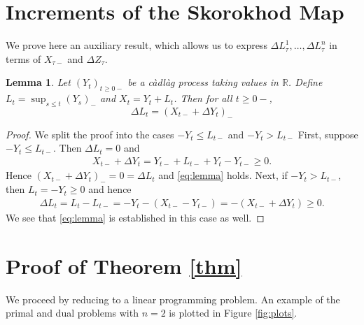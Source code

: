 \documentclass[12pt]{article}
\newcommand{\R}{\mathbb{R}}
\newcommand{\lb}{\left}
\newcommand{\rb}{\right}
\theoremstyle{plain}
\newtheorem{lemma}{Lemma}
\theoremstyle{definition}
\theoremstyle{remark}
\begin{document}
\section{Increments of the Skorokhod Map}

We prove here an auxiliary result, which allows us to express $\Delta L^1_\tau,\dots, \Delta L^n_\tau$ in terms of $X_{\tau-}$ and $\Delta Z_\tau$.

\begin{lemma}\label{lemma}
Let $(Y_t)_{t\ge 0-}$ be a c\`adl\`ag process taking values in $\R$. Define $L_t=\sup_{s\le t} (Y_s)_-$ and $X_t=Y_t+L_t$. Then for all $t\ge 0-$,
\begin{equation}\label{eq:lemma}
\Delta L_t =\lb(X_{t-}+\Delta Y_t\rb)_-
\end{equation}
\end{lemma}
\begin{proof}
We split the proof into the cases $-Y_t\le L_{t-}$ and $-Y_t> L_{t-}$
First, suppose $-Y_t\le L_{t-}$. Then $\Delta L_t=0$ and 
\begin{align*}
X_{t-}+\Delta Y_t=Y_{t-}+L_{t-}+Y_t-Y_{t-}\ge 0.
\end{align*}
Hence $\lb(X_{t-}+\Delta Y_t\rb)_-=0=\Delta L_t$ and \eqref{eq:lemma} holds. Next, if $-Y_t> L_{t-}$, then $L_t=-Y_t\ge 0$ and hence
\begin{align*}
\Delta L_t = L_t-L_{t-}=-Y_t-(X_{t-}-Y_{t-})=-(X_{t-}+\Delta Y_t)\ge 0.
\end{align*}
We see that \eqref{eq:lemma} is established in this case as well. \qedhere
\end{proof}

\section{Proof of Theorem \ref{thm}}\label{sec:proof}

We proceed by reducing to a linear programming problem. 
An example of the primal and dual problems with $n=2$ is plotted in Figure \ref{fig:plots}.
\end{document}
